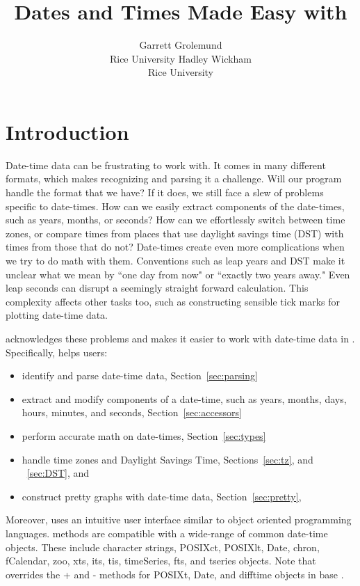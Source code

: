 \documentclass[article]{jss}
\author{Garrett Grolemund\\Rice University \And 
        Hadley Wickham\\Rice University}
\title{Dates and Times Made Easy with \pkg{lubridate}}
\begin{document}
\section{Introduction}

Date-time data can be frustrating to work with. It comes in many different formats, which makes recognizing and parsing it a challenge. Will our program handle the format that we have? If it does, we still face a slew of problems specific to date-times. How can we easily extract components of the date-times, such as years, months, or seconds? How can we effortlessly switch between time zones, or compare times from places that use daylight savings time (DST) with times from those that do not? Date-times create even more complications when we try to do math with them. Conventions such as leap years and DST make it unclear what we mean by ``one day from now" or ``exactly two years away."  Even leap seconds can disrupt a seemingly straight forward calculation.  This complexity affects other tasks too, such as constructing sensible tick marks for plotting date-time data.

  acknowledges these problems and makes it easier to work with date-time data in . Specifically,  helps users:

\begin{itemize}
   \item identify and parse date-time data, Section~\ref{sec:parsing} 
   
    \item extract and modify components of a date-time, such as years, months, days, hours, minutes, and seconds, Section~\ref{sec:accessors}
  
  \item perform accurate math on date-times, Section~\ref{sec:types}
    
  \item handle time zones and Daylight Savings Time, Sections~\ref{sec:tz}, and ~\ref{sec:DST}, and
  
   \item construct pretty graphs with date-time data, Section~\ref{sec:pretty}, 
  
\end{itemize}

Moreover,  uses an intuitive user interface similar to object oriented programming languages.   methods are compatible with a wide-range of common date-time objects. These include character strings, POSIXct, POSIXlt, Date, chron, fCalendar, zoo, xts, its, tis, timeSeries, fts, and tseries objects. Note that  overrides the + and - methods for POSIXt, Date, and difftime objects in base .\\
\end{document}
